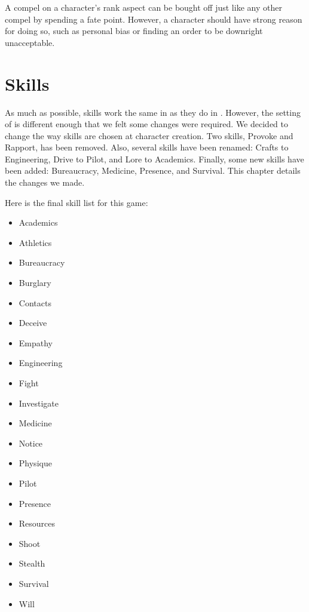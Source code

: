 \documentclass[12pt,titlepage,openany]{book}
\begin{document}
A compel on a character's rank aspect can be bought off just like any other
compel by spending a fate point. However, a character should have strong
reason for doing so, such as personal bias or finding an order to be downright
unacceptable.



\chapter{Skills}\label{chap:skills}

As much as possible, skills work the same in \StarTrekFate{} as they do in
\FateCore{}. However, the setting of \StarTrek{} is different enough that we
felt some changes were required. We decided to change the way skills are chosen
at character creation. Two skills, Provoke and Rapport, has been removed. Also,
several skills have been renamed: Crafts to Engineering, Drive to Pilot, and
Lore to Academics. Finally, some new skills have been added: Bureaucracy,
Medicine, Presence, and Survival. This chapter details the changes we made.

Here is the final skill list for this game:

\begin{multicols}{3}
    \raggedcolumns
    \begin{itemize}
        \item Academics
        \item Athletics
        \item Bureaucracy
        \item Burglary
        \item Contacts
        \item Deceive
        \item Empathy
        \item Engineering
        \item Fight
        \item Investigate
        \item Medicine
        \item Notice
        \item Physique
        \item Pilot
        \item Presence
        \item Resources
        \item Shoot
        \item Stealth
        \item Survival
        \item Will
    \end{itemize}
\end{multicols}
\end{document}
